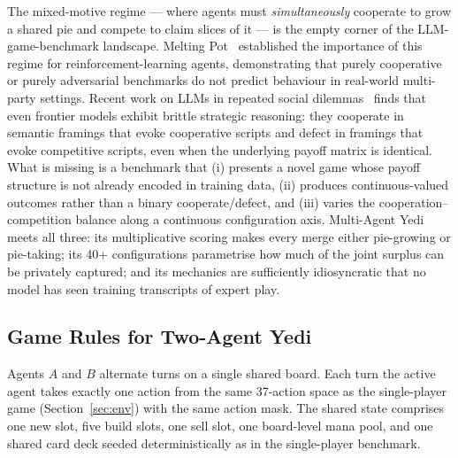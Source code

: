 \documentclass[11pt]{article}
\begin{document}
The mixed-motive regime --- where agents must \emph{simultaneously}
cooperate to grow a shared pie and compete to claim slices of it --- is
the empty corner of the LLM-game-benchmark landscape. Melting
Pot~\citep{leibo2021meltingpot} established the importance of this regime
for reinforcement-learning agents, demonstrating that purely cooperative
or purely adversarial benchmarks do not predict behaviour in real-world
multi-party settings. Recent work on LLMs in repeated social
dilemmas~\citep{akata2023playing, lore2023strategic} finds that even
frontier models exhibit brittle strategic reasoning: they cooperate in
semantic framings that evoke cooperative scripts and defect in framings
that evoke competitive scripts, even when the underlying payoff matrix is
identical. What is missing is a benchmark that (i) presents a novel
game whose payoff structure is not already encoded in training data,
(ii) produces continuous-valued outcomes rather than a binary
cooperate/defect, and (iii) varies the cooperation--competition balance
along a continuous configuration axis. Multi-Agent Yedi meets all three:
its multiplicative scoring makes every merge either pie-growing or
pie-taking; its 40+ configurations parametrise how much of the joint
surplus can be privately captured; and its mechanics are sufficiently
idiosyncratic that no model has seen training transcripts of expert play.

\subsection{Game Rules for Two-Agent Yedi}
\label{sec:ma-rules}

Agents $A$ and $B$ alternate turns on a single shared board. Each turn the
active agent takes exactly one action from the same 37-action space as
the single-player game (Section~\ref{sec:env}) with the same action mask.
The shared state comprises one new slot, five build slots, one sell slot,
one board-level mana pool, and one shared card deck seeded deterministically
as in the single-player benchmark.
\end{document}
